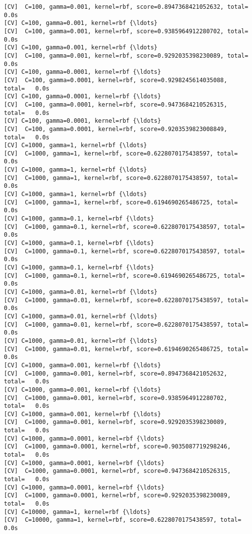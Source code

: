\documentclass[11pt]{article}
\begin{document}
\begin{Verbatim}[commandchars=\\\{\}]
[CV]  C=100, gamma=0.001, kernel=rbf, score=0.8947368421052632, total=   0.0s
[CV] C=100, gamma=0.001, kernel=rbf {\ldots}
[CV]  C=100, gamma=0.001, kernel=rbf, score=0.9385964912280702, total=   0.0s
[CV] C=100, gamma=0.001, kernel=rbf {\ldots}
[CV]  C=100, gamma=0.001, kernel=rbf, score=0.9292035398230089, total=   0.0s
[CV] C=100, gamma=0.0001, kernel=rbf {\ldots}
[CV]  C=100, gamma=0.0001, kernel=rbf, score=0.9298245614035088, total=   0.0s
[CV] C=100, gamma=0.0001, kernel=rbf {\ldots}
[CV]  C=100, gamma=0.0001, kernel=rbf, score=0.9473684210526315, total=   0.0s
[CV] C=100, gamma=0.0001, kernel=rbf {\ldots}
[CV]  C=100, gamma=0.0001, kernel=rbf, score=0.9203539823008849, total=   0.0s
[CV] C=1000, gamma=1, kernel=rbf {\ldots}
[CV]  C=1000, gamma=1, kernel=rbf, score=0.6228070175438597, total=   0.0s
[CV] C=1000, gamma=1, kernel=rbf {\ldots}
[CV]  C=1000, gamma=1, kernel=rbf, score=0.6228070175438597, total=   0.0s
[CV] C=1000, gamma=1, kernel=rbf {\ldots}
[CV]  C=1000, gamma=1, kernel=rbf, score=0.6194690265486725, total=   0.0s
[CV] C=1000, gamma=0.1, kernel=rbf {\ldots}
[CV]  C=1000, gamma=0.1, kernel=rbf, score=0.6228070175438597, total=   0.0s
[CV] C=1000, gamma=0.1, kernel=rbf {\ldots}
[CV]  C=1000, gamma=0.1, kernel=rbf, score=0.6228070175438597, total=   0.0s
[CV] C=1000, gamma=0.1, kernel=rbf {\ldots}
[CV]  C=1000, gamma=0.1, kernel=rbf, score=0.6194690265486725, total=   0.0s
[CV] C=1000, gamma=0.01, kernel=rbf {\ldots}
[CV]  C=1000, gamma=0.01, kernel=rbf, score=0.6228070175438597, total=   0.0s
[CV] C=1000, gamma=0.01, kernel=rbf {\ldots}
[CV]  C=1000, gamma=0.01, kernel=rbf, score=0.6228070175438597, total=   0.0s
[CV] C=1000, gamma=0.01, kernel=rbf {\ldots}
[CV]  C=1000, gamma=0.01, kernel=rbf, score=0.6194690265486725, total=   0.0s
[CV] C=1000, gamma=0.001, kernel=rbf {\ldots}
[CV]  C=1000, gamma=0.001, kernel=rbf, score=0.8947368421052632, total=   0.0s
[CV] C=1000, gamma=0.001, kernel=rbf {\ldots}
[CV]  C=1000, gamma=0.001, kernel=rbf, score=0.9385964912280702, total=   0.0s
[CV] C=1000, gamma=0.001, kernel=rbf {\ldots}
[CV]  C=1000, gamma=0.001, kernel=rbf, score=0.9292035398230089, total=   0.0s
[CV] C=1000, gamma=0.0001, kernel=rbf {\ldots}
[CV]  C=1000, gamma=0.0001, kernel=rbf, score=0.9035087719298246, total=   0.0s
[CV] C=1000, gamma=0.0001, kernel=rbf {\ldots}
[CV]  C=1000, gamma=0.0001, kernel=rbf, score=0.9473684210526315, total=   0.0s
[CV] C=1000, gamma=0.0001, kernel=rbf {\ldots}
[CV]  C=1000, gamma=0.0001, kernel=rbf, score=0.9292035398230089, total=   0.0s
[CV] C=10000, gamma=1, kernel=rbf {\ldots}
[CV]  C=10000, gamma=1, kernel=rbf, score=0.6228070175438597, total=   0.0s

\end{Verbatim}
\end{document}
